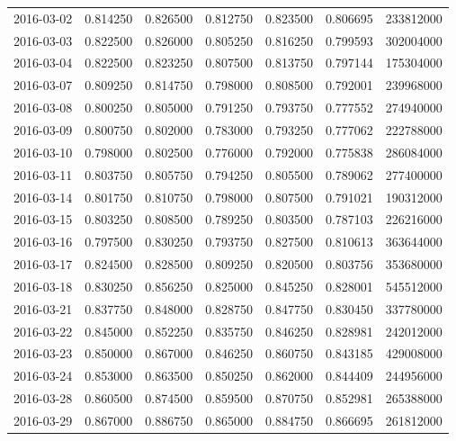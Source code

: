 \begin{tabular}{lrrrrrr}
2016-03-02 &    0.814250 &    0.826500 &    0.812750 &    0.823500 &    0.806695 &   233812000 \\
2016-03-03 &    0.822500 &    0.826000 &    0.805250 &    0.816250 &    0.799593 &   302004000 \\
2016-03-04 &    0.822500 &    0.823250 &    0.807500 &    0.813750 &    0.797144 &   175304000 \\
2016-03-07 &    0.809250 &    0.814750 &    0.798000 &    0.808500 &    0.792001 &   239968000 \\
2016-03-08 &    0.800250 &    0.805000 &    0.791250 &    0.793750 &    0.777552 &   274940000 \\
2016-03-09 &    0.800750 &    0.802000 &    0.783000 &    0.793250 &    0.777062 &   222788000 \\
2016-03-10 &    0.798000 &    0.802500 &    0.776000 &    0.792000 &    0.775838 &   286084000 \\
2016-03-11 &    0.803750 &    0.805750 &    0.794250 &    0.805500 &    0.789062 &   277400000 \\
2016-03-14 &    0.801750 &    0.810750 &    0.798000 &    0.807500 &    0.791021 &   190312000 \\
2016-03-15 &    0.803250 &    0.808500 &    0.789250 &    0.803500 &    0.787103 &   226216000 \\
2016-03-16 &    0.797500 &    0.830250 &    0.793750 &    0.827500 &    0.810613 &   363644000 \\
2016-03-17 &    0.824500 &    0.828500 &    0.809250 &    0.820500 &    0.803756 &   353680000 \\
2016-03-18 &    0.830250 &    0.856250 &    0.825000 &    0.845250 &    0.828001 &   545512000 \\
2016-03-21 &    0.837750 &    0.848000 &    0.828750 &    0.847750 &    0.830450 &   337780000 \\
2016-03-22 &    0.845000 &    0.852250 &    0.835750 &    0.846250 &    0.828981 &   242012000 \\
2016-03-23 &    0.850000 &    0.867000 &    0.846250 &    0.860750 &    0.843185 &   429008000 \\
2016-03-24 &    0.853000 &    0.863500 &    0.850250 &    0.862000 &    0.844409 &   244956000 \\
2016-03-28 &    0.860500 &    0.874500 &    0.859500 &    0.870750 &    0.852981 &   265388000 \\
2016-03-29 &    0.867000 &    0.886750 &    0.865000 &    0.884750 &    0.866695 &   261812000 \\

\end{tabular}
